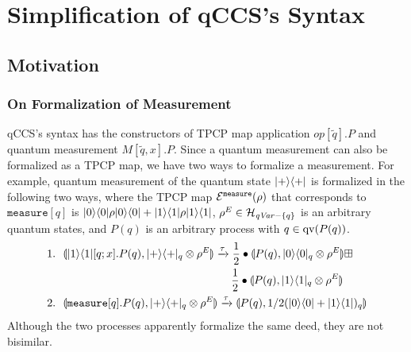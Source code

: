 \section{Simplification of qCCS's Syntax}
\subsection{Motivation}
\subsubsection{On Formalization of Measurement}
qCCS's syntax has the constructors of TPCP map
application $\mathit{op}[\tilde q].P$
and quantum measurement $M[\tilde q, x].P$.
Since a quantum measurement can also be formalized as a TPCP map,
we have two ways to formalize a measurement.
For example, quantum measurement of the quantum
state $|+\rangle\langle +|$
is formalized in the following two ways,
where the TPCP map $\mathcal{E}^{\mathtt{measure}}(\rho)$
that corresponds to $\mathtt{measure}[q]$ is $|0\rangle\langle 0|\rho
|0\rangle\langle 0|+|1\rangle\langle 1|\rho
|1\rangle\langle 1|$, $\rho^E \in \mathcal{H}_{\mathit{qVar} -\{q\}}$ is an arbitrary quantum
states, and $P(q)$ is an arbitrary process with $q \in \mathrm{qv}(P(q))$.
 \begin{align*}
  &1.~~\llparenthesis |1\rangle\langle 1|[q;x].P(q), |+\rangle\langle +|_q \otimes \rho^E \rrparenthesis
  \xrightarrow{\tau}
  \frac{1}{2} \bullet \llparenthesis P(q), |0\rangle\langle 0|_q \otimes \rho^E \rrparenthesis \boxplus\\
  &~~~~~~~~~~~~~~~~~~~~~~~~~~~~~~~~~~~~~~~~~~~~~~~~~~
  \frac{1}{2} \bullet \llparenthesis P(q), |1\rangle\langle 1|_q \otimes \rho^E \rrparenthesis\\
 &2.~~\llparenthesis \mathtt{measure}[q].P(q), |+\rangle\langle +|_q \otimes \rho^E \rrparenthesis
  \xrightarrow{\tau}
  \llparenthesis P(q), 1/2(|0\rangle\langle 0|+|1\rangle\langle 1|)_q \rrparenthesis
\end{align*}
Although the two processes apparently formalize the same deed,
they are not bisimilar.

